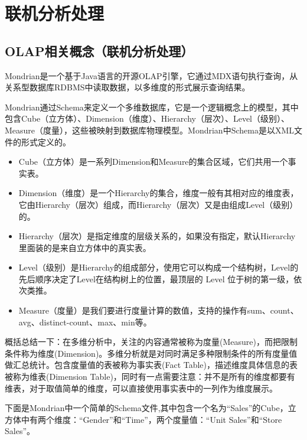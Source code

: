 \section{联机分析处理}
\subsection{OLAP相关概念（联机分析处理）}
\par Mondrian是一个基于Java语言的开源OLAP引擎，它通过MDX语句执行查询，从关系型数据库RDBMS中读取数据，以多维度的形式展示查询结果。
\par Mondrian通过Schema来定义一个多维数据库，它是一个逻辑概念上的模型，其中包含Cube（立方体）、Dimension（维度）、Hierarchy（层次）、Level（级别）、Measure（度量），这些被映射到数据库物理模型。Mondrian中Schema是以XML文件的形式定义的。
\begin{itemize}
\item Cube（立方体）是一系列Dimension和Measure的集合区域，它们共用一个事实表。
\item Dimension（维度）是一个Hierarchy的集合，维度一般有其相对应的维度表，它由Hierarchy（层次）组成，而Hierarchy（层次）又是由组成Level（级别）的。
\item Hierarchy（层次）是指定维度的层级关系的，如果没有指定，默认Hierarchy里面装的是来自立方体中的真实表。
\item Level（级别）是Hierarchy的组成部分，使用它可以构成一个结构树，Level的先后顺序决定了Level在结构树上的位置，最顶层的 Level 位于树的第一级，依次类推。
\item Measure（度量）是我们要进行度量计算的数值，支持的操作有sum、count、avg、distinct-count、max、min等。
\end{itemize}
\par 概括总结一下：在多维分析中，关注的内容通常被称为度量(Measure)，而把限制条件称为维度(Dimension)。多维分析就是对同时满足多种限制条件的所有度量值做汇总统计。包含度量值的表被称为事实表(Fact Table)，描述维度具体信息的表被称为维表(Dimension Table)，同时有一点需要注意：并不是所有的维度都要有维表，对于取值简单的维度，可以直接使用事实表中的一列作为维度展示。
\par 下面是Mondrian中一个简单的Schema文件,其中包含一个名为“Sales”的Cube，立方体中有两个维度：“Gender”和“Time”，两个度量值：“Unit Sales”和“Store Sales”。
